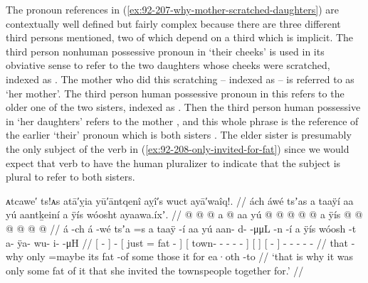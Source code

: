 The pronoun references in (\ref{ex:92-207-why-mother-scratched-daughters}) are contextually well defined but fairly complex because there are three different third persons mentioned, two of which depend on a third which is implicit.
The third person nonhuman possessive pronoun  in  ‘their cheeks’ is used in its obviative sense to refer to the two daughters whose cheeks were scratched, indexed as .
The mother who did this scratching – indexed as  – is referred to as  ‘her mother’.
The third person human possessive pronoun  in this refers to the older one of the two sisters, indexed as .
Then the third person human possessive  in  ‘her daughters’ refers to the mother , and this whole phrase is the reference of the earlier  ‘their’ pronoun which is both sisters .
The elder sister  is presumably the only subject of the verb in (\ref{ex:92-208-only-invited-for-fat}) since we would expect that verb to have the human pluralizer  to indicate that the subject is plural to refer to both sisters.

\ex\label{ex:92-208-only-invited-for-fat}%
%
\begingl
	\glpreamble	ᴀtcawe′ ts!ᴀs atā′ỵia yū′āntqenî aỵî′s wuct ayā′waîq!. //
	\glpreamble	ách áwé tsʼas a taaÿí aa yú aantḵeiní a ÿís wóosht ayaawa.íxʼ. //
	\gla	{}  @ {} {}  @ {}
		{}  @ {} a  @ {} aa {}
		{} yú  @ {} @ {} @ {} @ {} @ {} {}
		{} a ÿís {}
		{}  @ {} {}
		 @ {} @ {} @ {} @ {} @ {} //
	\glb	{} á -ch {} á -wé
		{} tsʼa =s a taaÿ -í aa {}
		{} yú aan- d-  -μμL -n -í {}
		{} a ÿís {}
		{} wóosh -t {}
		a- ÿa- wu- i-  -μH //
	\glc	{}[  - {}]  -
		{}[ just =  fat -  {}]
		{}[  town- -  - - - {}]
		{}[   {}]
		{}[  - {}]
		- - - -  - //
	\gld	{} that -why {}  {}
		{} only =maybe its fat -of some {}
		{} those  {} {} {} {} {} {}
		{} it for {}
		{} ea·oth -to {}
		 {} {} {} {} {} //
	\glft	‘that is why it was only some fat of it that she invited the townspeople together for.’
		//
\endgl
\xe

